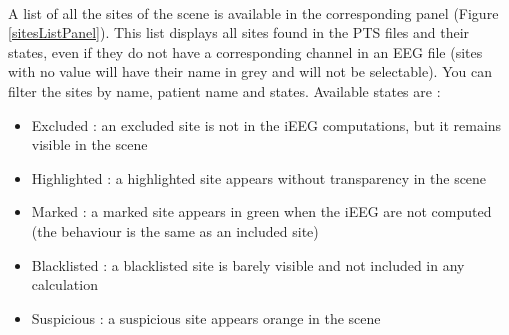 \documentclass[a4paper]{article}
\begin{document}
\paragraph{} A list of all the sites of the scene is available in the corresponding panel (Figure \ref{sitesListPanel}). This list displays all sites found in the PTS files and their states, even if they do not have a corresponding channel in an EEG file (sites with no value will have their name in grey and will not be selectable). You can filter the sites by name, patient name and states.  Available states are :
\begin{itemize}
\item Excluded : an excluded site is not in the iEEG computations, but it remains visible in the scene
\item Highlighted : a highlighted site appears without transparency in the scene
\item Marked : a marked site appears in green when the iEEG are not computed (the behaviour is the same as an included site)
\item Blacklisted : a blacklisted site is barely visible and not included in any calculation
\item Suspicious : a suspicious site appears orange in the scene
\end{itemize}
\end{document}
